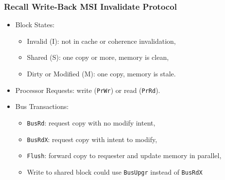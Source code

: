 \documentclass{beamer}
\newcommand{\emp}[1]{\textcolor{DikuRed}{ #1}}
\begin{document}
\begin{frame}[fragile,t]
\frametitle{Recall Write-Back MSI Invalidate Protocol}

\begin{itemize}
    \item \emp{Block States}: 
        \begin{itemize}
            \item Invalid (I): not in cache or coherence invalidation,
            \item Shared (S): one copy or more, memory is clean,
            \item Dirty or Modified (M): one copy, memory is stale.
        \end  {itemize}\smallskip

    \item \emp{Processor Requests}: write ({\tt PrWr}) or read ({\tt PrRd}).\smallskip

    \item \emp{Bus Transactions}:
        \begin{itemize}
            \item {\tt BusRd}: request copy with no modify intent,
            \item {\tt BusRdX}: request copy with intent to modify,
            \item {\tt Flush}: forward copy to requester and update memory in parallel,
            \item Write to shared block could use {\tt BusUpgr} instead of {\tt BusRdX}
        \end  {itemize}
\end{itemize}
\vspace{-2ex}


\end{frame}
\end{document}
